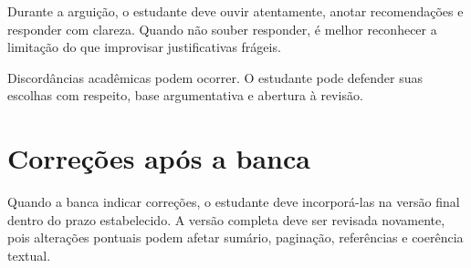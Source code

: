 Durante a arguição, o estudante deve ouvir atentamente, anotar recomendações e responder com clareza. Quando não souber responder, é melhor reconhecer a limitação do que improvisar justificativas frágeis.

Discordâncias acadêmicas podem ocorrer. O estudante pode defender suas escolhas com respeito, base argumentativa e abertura à revisão.

\section{Correções após a banca}

Quando a banca indicar correções, o estudante deve incorporá-las na versão final dentro do prazo estabelecido. A versão completa deve ser revisada novamente, pois alterações pontuais podem afetar sumário, paginação, referências e coerência textual.

